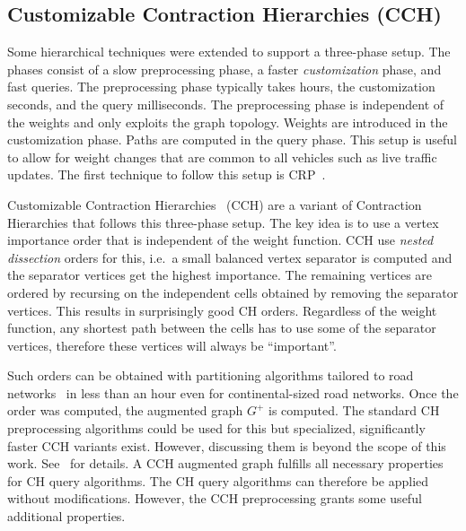 \documentclass[manuscript,review]{acmart}
\begin{document}
\subsection{Customizable Contraction Hierarchies (CCH)}
\label{sec:cch-intro}

Some hierarchical techniques were extended to support a three-phase setup.
The phases consist of a slow preprocessing phase, a faster \emph{customization} phase, and fast queries.
The preprocessing phase typically takes hours, the customization seconds, and the query milliseconds.
The preprocessing phase is independent of the weights and only exploits the graph topology.
Weights are introduced in the customization phase.
Paths are computed in the query phase.
This setup is useful to allow for weight changes that are common to all vehicles such as live traffic updates.
The first technique to follow this setup is CRP~\cite{dgpw-crprn-13}. %

Customizable Contraction Hierarchies~\cite{dsw-cch-15} (CCH) are a variant of Contraction Hierarchies that follows this three-phase setup.
The key idea is to use a vertex importance order that is independent of the weight function.
CCH use \emph{nested dissection} orders for this, i.e.\ a small balanced vertex separator is computed and the separator vertices get the highest importance.
The remaining vertices are ordered by recursing on the independent cells obtained by removing the separator vertices.
This results in surprisingly good CH orders.
Regardless of the weight function, any shortest path between the cells has to use some of the separator vertices, therefore these vertices will always be ``important''.

Such orders can be obtained with partitioning algorithms tailored to road networks~\cite{GottesburenHUW19} in less than an hour even for continental-sized road networks.
Once the order was computed, the augmented graph $G^+$ is computed.
The standard CH preprocessing algorithms could be used for this but specialized, significantly faster CCH variants exist.
However, discussing them is beyond the scope of this work.
See~\cite{dsw-cch-15,BuchholdSW19} for details.
A CCH augmented graph fulfills all necessary properties for CH query algorithms.
The CH query algorithms can therefore be applied without modifications.
However, the CCH preprocessing grants some useful additional properties.
\end{document}

